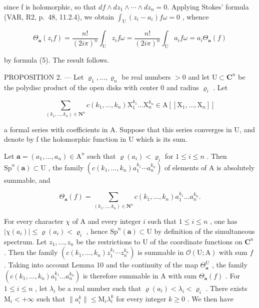 since f is holomorphic, so that \(df \wedge dz_{1} \wedge \cdots \wedge dz_{n} = 0\). Applying Stokes' formula (VAR, R2, p.~48, 11.2.4), we obtain \(\int_{\mathrm{U}}(z_{i} - a_{i})f\omega = 0\) , whence

\[
\Theta_ {\boldsymbol {a}} (z _ {i} f) = \frac {n !}{(2 i \pi) ^ {n}} \int_ {\mathrm{U}} z _ {i} f \omega = \frac {n !}{(2 i \pi) ^ {n}} \int_ {\mathrm{U}} a _ {i} f \omega = a _ {i} \Theta_ {\boldsymbol {a}} (f)
\]

by formula (5). The result follows.

PROPOSITION 2. — Let \(\varrho_{1},\ldots,\varrho_{n}\) be real numbers \(>0\) and let \(\mathrm{U}\subset\mathbf{C}^{n}\) be the polydisc product of the open disks with center 0 and radius \(\varrho_{i}\) . Let

\[
\sum_ {(k _ {1}, \dots , k _ {n}) \in \mathbf {N} ^ {n}} c (k _ {1}, \dots , k _ {n}) \mathrm{X} _ {1} ^ {k _ {1}} \dots \mathrm{X} _ {n} ^ {k _ {n}} \in \mathrm{A} [ [ \mathrm{X} _ {1}, \dots , \mathrm{X} _ {n} ] ]
\]

a formal series with coefficients in A. Suppose that this series converges in U, and denote by f the holomorphic function in U which is its sum.

Let \(\boldsymbol{a}=(a_{1},\ldots,a_{n})\in\mathrm{A}^{n}\) such that \(\varrho(a_{i})<\varrho_{i}\) for \(1\leqslant i\leqslant n\) . Then \(\mathrm{Sp}^{n}(\boldsymbol{a})\subset\mathrm{U}\) , the family \((c(k_{1},\ldots,k_{n})a_{1}^{k_{1}}\cdots a_{n}^{k_{n}})\) of elements of A is absolutely summable, and

\[
\Theta_ {\boldsymbol {a}} (f) = \sum_ {(k _ {1}, \dots , k _ {n}) \in \mathbf {N} ^ {n}} c (k _ {1}, \dots , k _ {n}) a _ {1} ^ {k _ {1}} \dots a _ {n} ^ {k _ {n}}.
\]

For every character \(\chi\) of A and every integer \(i\) such that \(1 \leqslant i \leqslant n\) , one has \(|\chi(a_i)| \leqslant \varrho(a_i) < \varrho_i\) , hence \(\mathrm{Sp}^n(\boldsymbol{a}) \subset \mathrm{U}\) by definition of the simultaneous spectrum. Let \(z_1, \ldots, z_n\) be the restrictions to U of the coordinate functions on \(\mathbf{C}^n\) . Then the family \((c(k_1, \ldots, k_n)z_1^{k_1} \cdots z_n^{k_n})\) is summable in \(\mathcal{O}(\mathrm{U}; \mathrm{A})\) with sum \(f\) . Taking into account Lemma 10 and the continuity of the map \(\Theta_{\boldsymbol{a}}^{\mathrm{U}}\) , the family \((c(k_1, \ldots, k_n)a_1^{k_1} \ldots a_n^{k_n})\) is therefore summable in A with sum \(\Theta_{\boldsymbol{a}}(f)\) . For \(1 \leqslant i \leqslant n\) , let \(\lambda_i\) be a real number such that \(\varrho(a_i) < \lambda_i < \varrho_i\) . There exists \(\mathrm{M}_i < +\infty\) such that \(\|a_i^k\| \leqslant \mathrm{M}_i\lambda_i^k\) for every integer \(k \geqslant 0\) . We then have

